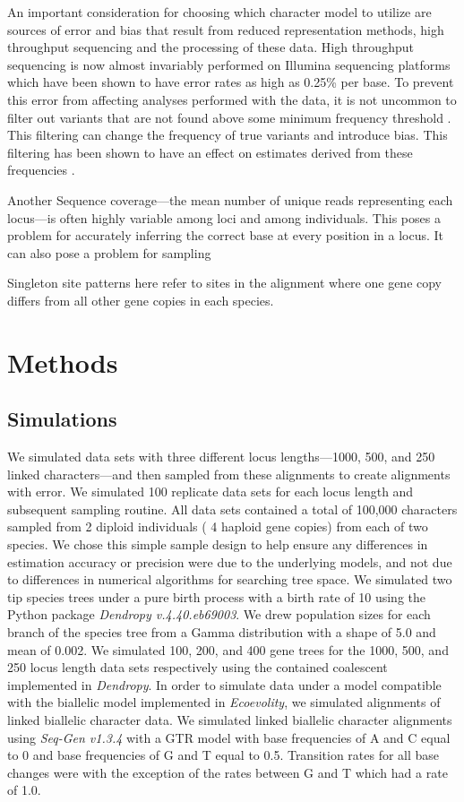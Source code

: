 An important consideration for choosing which character model to utilize are
sources of error and bias that result from reduced representation methods,
high throughput sequencing and the processing of these data. High throughput
sequencing is now almost invariably performed on Illumina sequencing platforms
which have been shown to have error rates as high as 0.25\% per base. 
To prevent this error from affecting analyses performed with the data, it is not 
uncommon to filter out variants that are not found above some minimum frequency 
threshold \citep{rochetteStacksAnalyticalMethods2019, linckMinorAlleleFrequency2019}. 
This filtering can change the frequency of true variants and introduce bias. 
This filtering has been shown to have an effect on estimates derived from these 
frequencies \citep{linckMinorAlleleFrequency2019}.

Another 
Sequence coverage---the mean number of unique reads representing each locus---is
often highly variable among loci and among individuals. This poses a problem for
accurately inferring the correct base at every position in a locus. It can also
pose a problem for sampling 


	
Singleton site patterns here refer to sites in the alignment where one gene 
copy differs from all other gene copies in each species.


\section{Methods}
\subsection{Simulations}
We simulated data sets with three different locus lengths—1000, 500, and 250 
linked characters—and then sampled from these alignments to create alignments 
with  error. We simulated 100 replicate data sets for each locus length and 
subsequent sampling routine. All data sets contained a total of 100,000 
characters sampled from 2 diploid individuals ( 4 haploid gene copies) from each 
of two species. We chose this simple sample design to help ensure any 
differences in estimation accuracy or precision were due to the underlying 
models, and not due to differences in numerical algorithms for searching tree 
space.  We simulated two tip species trees under a pure birth process with a 
birth rate of 10 using the Python package \textit{Dendropy v.4.40.eb69003}.  
We drew population sizes for each branch of the species tree from a Gamma 
distribution with a shape of 5.0 and mean of 0.002. We simulated 100, 200, and 
400 gene trees for the 1000, 500, and 250 locus length data sets respectively 
using the contained coalescent implemented in \textit{Dendropy}. In order to 
simulate data under a model compatible with the biallelic model implemented in 
\textit{Ecoevolity}, we simulated alignments of linked biallelic character data. 
We simulated linked biallelic character alignments using \textit{Seq-Gen v1.3.4}
with a GTR model with base frequencies of A and C equal to 0 and base 
frequencies of G and T equal to 0.5. Transition rates for all base changes were 
with the exception of the rates between G and T which had a rate of 1.0. 

